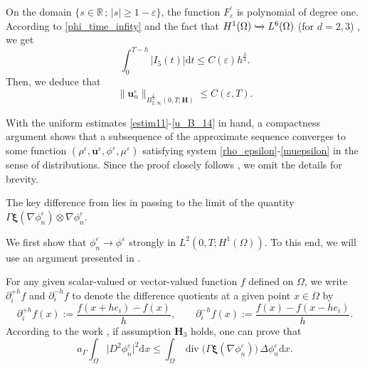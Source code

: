 \documentclass[11pt]{article}
\def\bq{\begin{equation}}
\def\eq{\end{equation}}
\def\bfH{\mathbf{H}}
\def\bfu{\mathbf{u}}
\def\bfxi{\boldsymbol{\xi}}
\def\md{\mathrm{d}}
\def\bq{\begin{equation}}
\def\eq{\end{equation}}
\def\Ga{\Gamma}
\def\Om{\Omega}
\begin{document}
On the domain $\{s\in \mathbb{R}\, ;\, |s|\geq 1-\varepsilon \}$, the function $F_{\varepsilon}^{\prime}$ is polynomial of degree one. {  According to \eqref{phi_time_infity} %
and the fact that $H^1(\Om)\xhookrightarrow{} L^6(\Om)$ (for $d=2,3$)}
, we get
$$
\int_0^{T-h}\left|I_5(t)\right| \mathrm{d} t \leq C(\varepsilon)h^{\frac{3}{4}} .
$$
Then, we deduce that
\bq
\|\bfu_n^{\varepsilon}\|_{B_{2,\infty}^{\frac{1}{4}}(0,T;\bfH)} \leq C(\varepsilon,T).\label{u_B_14}
\eq

With the uniform estimates \eqref{estim11}-\eqref{u_B_14} in hand,  a compactness argument shows that a subsequence of the approximate sequence converges to some function
$(\rho^{\varepsilon},\bfu^{\varepsilon},\phi^{\varepsilon},\mu^{\varepsilon})$ satisfying system \eqref{rho_epsilon}-\eqref{muepsilon} in the sense of distributions. Since the proof closely follows \cite{giorgini2020weak}, we omit the details for brevity. {The key difference from \cite{giorgini2020weak} lies in passing to the limit of the quantity \( \Gamma \bfxi(\nabla \phi_n^{\varepsilon}) \otimes \nabla \phi_n^{\varepsilon} \). %
{  We first show that \( \phi_n^{\varepsilon} \rightarrow \phi^{\varepsilon} \) strongly in \( L^2(0,T; H^1(\Omega)) \). To this end, we will use an argument presented in \cite{Garcke}.


For any given scalar-valued or vector-valued function $f$ defined on $\Omega$, we write
$\partial^{+h}_i f$ and $\partial^{-h}_i f$ to denote the difference quotients at a
given point $x \in \Omega$ by
\[
\partial^{+h}_i f(x)
:= \frac{f(x + h e_i) - f(x)}{h},
\qquad
\partial^{-h}_i f(x)
:= \frac{f(x) - f(x - h e_i)}{h}.
\]
According to the work \cite[see page 12]{Garcke}, if assumption ${\bfH_3}$ holds, one can prove that 
\[
a_\Ga \int_{\Omega} \lvert D^2 \phi_n^{\varepsilon} \rvert^2\md x
\le
\int_{\Omega} \operatorname{div}\!\bigl(\Ga\bfxi(\nabla \phi_n^{\varepsilon})\bigr)\,\Delta \phi_n^{\varepsilon}\md x.
\]

}}
\end{document}
